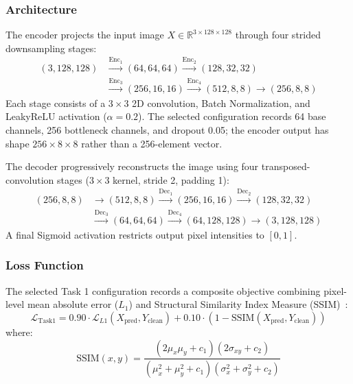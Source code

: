 \documentclass[journal,compsoc]{IEEEtran}
\begin{document}
\subsubsection{Architecture}
The encoder projects the input image $X \in \mathbb{R}^{3 \times 128 \times 128}$ through four strided downsampling stages:
\begin{equation}
\begin{aligned}
    (3, 128, 128) &\xrightarrow{\text{Enc}_1} (64, 64, 64) \xrightarrow{\text{Enc}_2} (128, 32, 32) \\
    &\xrightarrow{\text{Enc}_3} (256, 16, 16) \xrightarrow{\text{Enc}_4} (512, 8, 8) \to (256,8,8)
\end{aligned}
\end{equation}
Each stage consists of a $3 \times 3$ 2D convolution, Batch Normalization, and LeakyReLU activation ($\alpha = 0.2$). The selected configuration records 64 base channels, 256 bottleneck channels, and dropout 0.05; the encoder output has shape $256\times8\times8$ rather than a 256-element vector.

The decoder progressively reconstructs the image using four transposed-convolution stages ($3 \times 3$ kernel, stride 2, padding 1):
\begin{equation}
\begin{aligned}
    (256, 8, 8) &\to (512,8,8) \xrightarrow{\text{Dec}_1} (256, 16, 16) \xrightarrow{\text{Dec}_2} (128, 32, 32) \\
    &\xrightarrow{\text{Dec}_3} (64, 64, 64) \xrightarrow{\text{Dec}_4} (64,128,128) \to (3,128,128)
\end{aligned}
\end{equation}
A final Sigmoid activation restricts output pixel intensities to $[0, 1]$.

\subsubsection{Loss Function}
The selected Task 1 configuration records a composite objective combining pixel-level mean absolute error ($L_1$) and Structural Similarity Index Measure (SSIM)~\cite{wang2004image}:
\begin{equation}
    \mathcal{L}_{\text{Task1}} = 0.90 \cdot \mathcal{L}_{L1}(X_{\text{pred}}, Y_{\text{clean}}) + 0.10 \cdot (1 - \text{SSIM}(X_{\text{pred}}, Y_{\text{clean}}))
\end{equation}
where:
\begin{equation}
    \text{SSIM}(x, y) = \frac{(2\mu_x\mu_y + c_1)(2\sigma_{xy} + c_2)}{(\mu_x^2 + \mu_y^2 + c_1)(\sigma_x^2 + \sigma_y^2 + c_2)}
\end{equation}
\end{document}

